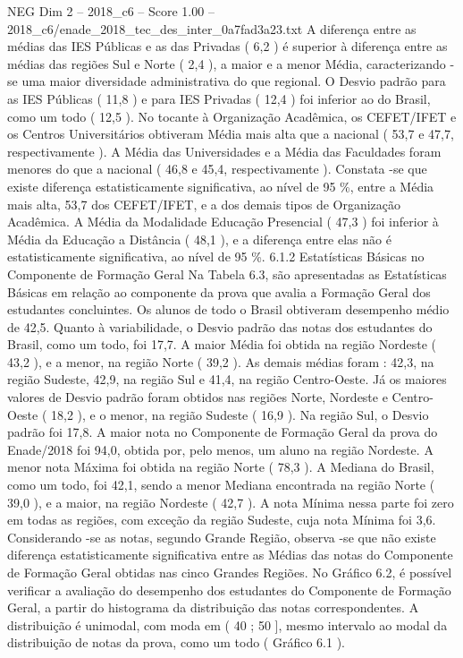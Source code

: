 \begin{textsample}{NEG Dim 2 – 2018\_c6 – Score 1.00 – 2018\_c6/enade\_2018\_tec\_des\_inter\_0a7fad3a23.txt}
A diferença entre as médias das IES Públicas e as das Privadas ( 6,2 ) é superior à diferença entre as médias das regiões Sul e Norte ( 2,4 ), a maior e a menor Média, caracterizando -se uma maior diversidade administrativa do que regional.
O Desvio padrão para as IES Públicas ( 11,8 ) e para IES Privadas ( 12,4 ) foi inferior ao do Brasil, como um todo ( 12,5 ).
No tocante à Organização Acadêmica, os CEFET/IFET e os Centros Universitários obtiveram Média mais alta que a nacional ( 53,7 e 47,7, respectivamente ).
A Média das Universidades e a Média das Faculdades foram menores do que a nacional ( 46,8 e 45,4, respectivamente ).
Constata -se que existe diferença estatisticamente significativa, ao nível de 95 \%, entre a Média mais alta, 53,7 dos CEFET/IFET, e a dos demais tipos de Organização Acadêmica.
A Média da Modalidade Educação Presencial ( 47,3 ) foi inferior à Média da Educação a Distância ( 48,1 ), e a diferença entre elas não é estatisticamente significativa, ao nível de 95 \%. 6.1.2 Estatísticas Básicas no Componente de Formação Geral Na Tabela 6.3, são apresentadas as Estatísticas Básicas em relação ao componente da prova que avalia a Formação Geral dos estudantes concluintes.
Os alunos de todo o Brasil obtiveram desempenho médio de 42,5.
Quanto à variabilidade, o Desvio padrão das notas dos estudantes do Brasil, como um todo, foi 17,7.
A maior Média foi obtida na região Nordeste ( 43,2 ), e a menor, na região Norte ( 39,2 ).
As demais médias foram : 42,3, na região Sudeste, 42,9, na região Sul e 41,4, na região Centro-Oeste.
Já os maiores valores de Desvio padrão foram obtidos nas regiões Norte, Nordeste e Centro-Oeste ( 18,2 ), e o menor, na região Sudeste ( 16,9 ).
Na região Sul, o Desvio padrão foi 17,8.
A maior nota no Componente de Formação Geral da prova do Enade/2018 foi 94,0, obtida por, pelo menos, um aluno na região Nordeste.
A menor nota Máxima foi obtida na região Norte ( 78,3 ).
A Mediana do Brasil, como um todo, foi 42,1, sendo a menor Mediana encontrada na região Norte ( 39,0 ), e a maior, na região Nordeste ( 42,7 ).
A nota Mínima nessa parte foi zero em todas as regiões, com exceção da região Sudeste, cuja nota Mínima foi 3,6.
Considerando -se as notas, segundo Grande Região, observa -se que não existe diferença estatisticamente significativa entre as Médias das notas do Componente de Formação Geral obtidas nas cinco Grandes Regiões.
No Gráfico 6.2, é possível verificar a avaliação do desempenho dos estudantes do Componente de Formação Geral, a partir do histograma da distribuição das notas correspondentes.
A distribuição é unimodal, com moda em ( 40 ; 50 ], mesmo intervalo ao modal da distribuição de notas da prova, como um todo ( Gráfico 6.1 ).

\end{textsample}
